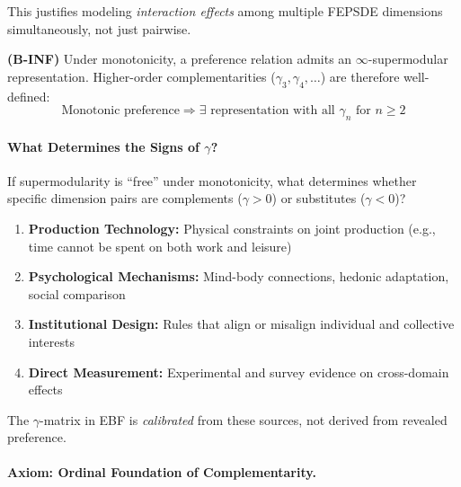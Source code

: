 This justifies modeling \emph{interaction effects} among multiple FEPSDE 
dimensions simultaneously, not just pairwise.

\begin{axiom}
\label{ax:B-INF}
\textbf{(B-INF)} Under monotonicity, a preference relation admits an 
$\infty$-supermodular representation. Higher-order complementarities 
($\gamma_3, \gamma_4, \ldots$) are therefore well-defined:
\begin{equation}
    \text{Monotonic preference} \Rightarrow \exists \text{ representation with all } 
    \gamma_n \text{ for } n \geq 2
\end{equation}
\end{axiom}



\paragraph{What Determines the Signs of $\gamma$?}

If supermodularity is ``free'' under monotonicity, what determines whether 
specific dimension pairs are complements ($\gamma > 0$) or substitutes 
($\gamma < 0$)?

\begin{enumerate}
    \item \textbf{Production Technology:} Physical constraints on joint 
    production (e.g., time cannot be spent on both work and leisure)
    
    \item \textbf{Psychological Mechanisms:} Mind-body connections, 
    hedonic adaptation, social comparison
    
    \item \textbf{Institutional Design:} Rules that align or misalign 
    individual and collective interests
    
    \item \textbf{Direct Measurement:} Experimental and survey evidence 
    on cross-domain effects
\end{enumerate}

The $\gamma$-matrix in EBF is \emph{calibrated} from these sources, 
not derived from revealed preference.

\paragraph{Axiom: Ordinal Foundation of Complementarity.}

